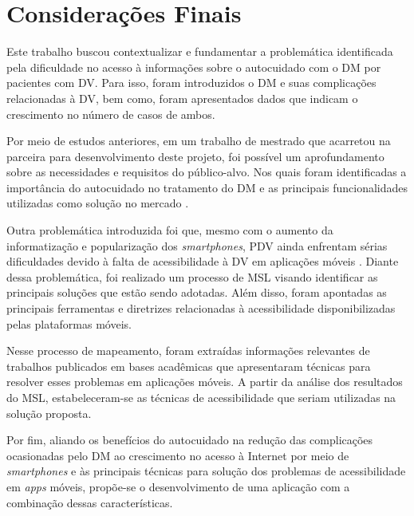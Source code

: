 \chapter{Considerações Finais}
\label{ch:conclusion}

Este trabalho buscou contextualizar e fundamentar a problemática identificada pela dificuldade
no acesso à informações sobre o autocuidado com o DM por pacientes com DV\@. Para isso, foram introduzidos
o DM e suas complicações relacionadas à DV, bem como, foram apresentados dados que indicam o crescimento no
número de casos de ambos.

Por meio de estudos anteriores, em um trabalho de mestrado que acarretou na parceira para desenvolvimento deste
projeto, foi possível um aprofundamento sobre as necessidades e requisitos do público-alvo.
Nos quais foram identificadas a importância do autocuidado no tratamento do DM e as principais funcionalidades utilizadas
como solução no mercado \cite{Sobral2021}.

Outra problemática introduzida foi que, mesmo com o aumento da informatização e popularização dos \emph{smartphones},
PDV ainda enfrentam sérias dificuldades devido à falta de acessibilidade à DV em aplicações móveis \cite{Shera2021285}.
Diante dessa problemática, foi realizado um processo de MSL visando identificar as principais soluções que estão sendo adotadas.
Além disso, foram apontadas as principais ferramentas e diretrizes relacionadas à acessibilidade disponibilizadas pelas
plataformas móveis.

Nesse processo de mapeamento, foram extraídas informações relevantes
de trabalhos publicados em bases acadêmicas que apresentaram técnicas para resolver esses problemas
em aplicações móveis.
A partir da análise dos resultados do MSL, estabeleceram-se as técnicas de acessibilidade que seriam utilizadas
na solução proposta.

Por fim, aliando os benefícios do autocuidado na redução das complicações ocasionadas pelo DM
\cite{ADA2019} ao crescimento no acesso à Internet por meio de \emph{smartphones} \cite{CETIC_2021}
e às principais técnicas para solução dos problemas de acessibilidade em \emph{apps} móveis,
propõe-se o desenvolvimento de uma aplicação com a combinação dessas características.